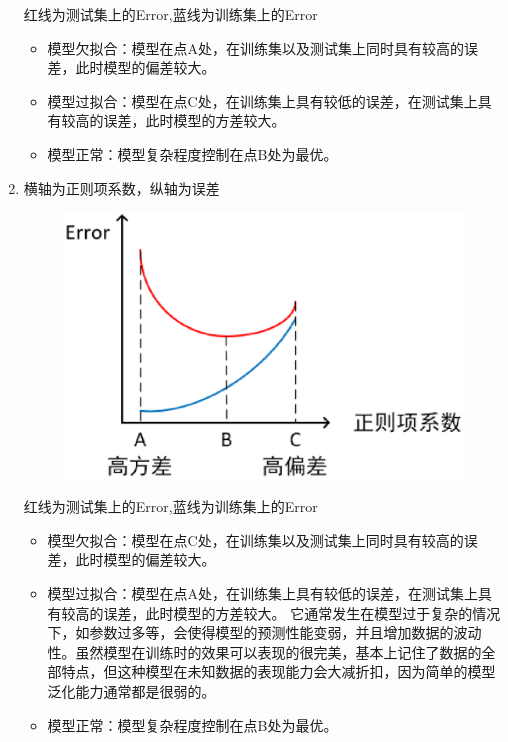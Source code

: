 \begin{enumerate}
		红线为测试集上的Error,蓝线为训练集上的Error

		\begin{itemize}
			\itemsep0em 
			\item 模型欠拟合：模型在点A处，在训练集以及测试集上同时具有较高的误差，此时模型的偏差较大。
			\item 模型过拟合：模型在点C处，在训练集上具有较低的误差，在测试集上具有较高的误差，此时模型的方差较大。 
			\item 模型正常：模型复杂程度控制在点B处为最优。
		\end{itemize}

	\item 横轴为正则项系数，纵轴为误差

		\begin{figure}[h]
			\centering
			\includegraphics[width=.9\textwidth]{imgs/2.16.4.3.eps}
			\label{fig:2.16.4.1}
		\end{figure}

		红线为测试集上的Error,蓝线为训练集上的Error

		\begin{itemize}
			\itemsep0em 
			\item	模型欠拟合：模型在点C处，在训练集以及测试集上同时具有较高的误差，此时模型的偏差较大。
			\item	模型过拟合：模型在点A处，在训练集上具有较低的误差，在测试集上具有较高的误差，此时模型的方差较大。 它通常发生在模型过于复杂的情况下，如参数过多等，会使得模型的预测性能变弱，并且增加数据的波动性。虽然模型在训练时的效果可以表现的很完美，基本上记住了数据的全部特点，但这种模型在未知数据的表现能力会大减折扣，因为简单的模型泛化能力通常都是很弱的。
			\item	模型正常：模型复杂程度控制在点B处为最优。
		\end{itemize}
\end{enumerate}

